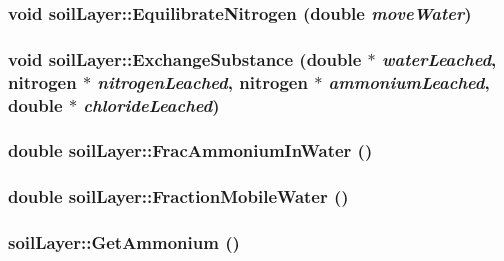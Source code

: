 \label{classsoil_layer_ac1c46edeecd5a54044c434adf939301b}
\hypertarget{classsoil_layer_a0761c6670b5ffb8affd945117f84335b}{
\subsubsection[{EquilibrateNitrogen}]{\setlength{\rightskip}{0pt plus 5cm}void soilLayer::EquilibrateNitrogen (double {\em moveWater})}}
\label{classsoil_layer_a0761c6670b5ffb8affd945117f84335b}
\hypertarget{classsoil_layer_a2a88f50eac8285e6fc12447276c0daff}{
\subsubsection[{ExchangeSubstance}]{\setlength{\rightskip}{0pt plus 5cm}void soilLayer::ExchangeSubstance (double $\ast$ {\em waterLeached}, \/  {\bf nitrogen} $\ast$ {\em nitrogenLeached}, \/  {\bf nitrogen} $\ast$ {\em ammoniumLeached}, \/  double $\ast$ {\em chlorideLeached})}}
\label{classsoil_layer_a2a88f50eac8285e6fc12447276c0daff}
\hypertarget{classsoil_layer_a45a1255f7f65f6f2ac3087b13061ee93}{
\subsubsection[{FracAmmoniumInWater}]{\setlength{\rightskip}{0pt plus 5cm}double soilLayer::FracAmmoniumInWater ()}}
\label{classsoil_layer_a45a1255f7f65f6f2ac3087b13061ee93}
\hypertarget{classsoil_layer_a7e696db2177aef85f23ca3c21b076d93}{
\subsubsection[{FractionMobileWater}]{\setlength{\rightskip}{0pt plus 5cm}double soilLayer::FractionMobileWater ()}}
\label{classsoil_layer_a7e696db2177aef85f23ca3c21b076d93}
\hypertarget{classsoil_layer_aa5fa8a32edd6f42e0cb5fac607a65b29}{
\subsubsection[{GetAmmonium}]{ soilLayer::GetAmmonium ()}}
